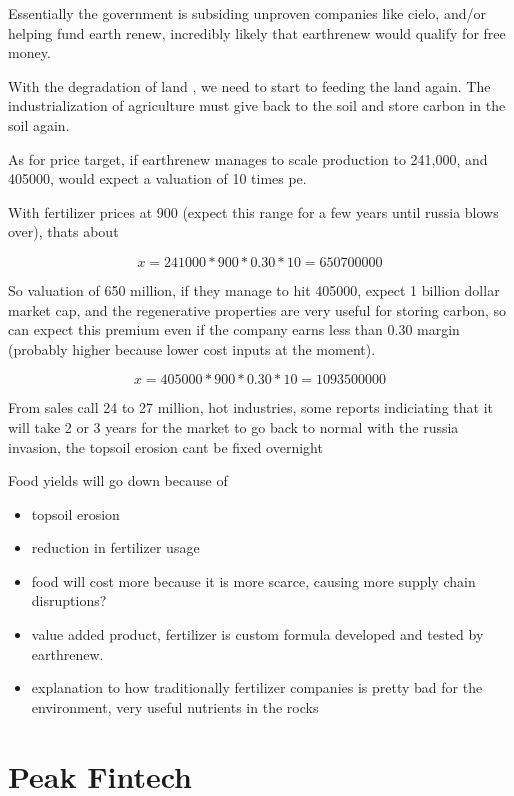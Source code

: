 Essentially the government is subsiding unproven companies like cielo, and/or helping fund earth renew, incredibly likely that earthrenew would qualify for free money.

With the degradation of land \cite{the_guardian_degraded_2022}, we need to start to feeding the land again. The industrialization of agriculture must give back to the soil and store carbon in the soil again.

As for price target, if earthrenew manages to scale production to 241,000, and 405000, would expect a valuation of 10 times pe.

With fertilizer prices at 900 (expect this range for a few years until russia blows over), thats about 

\begin{equation}
  x = 241000*900*0.30*10 = 650700000
\end{equation}

So valuation of 650 million, if they manage to hit 405000, expect 1 billion dollar market cap, and the regenerative properties are very useful for storing carbon, so can expect this premium even if the company earns less than 0.30 margin (probably higher because lower cost inputs at the moment).

\begin{equation}
  x = 405000*900*0.30*10 = 1093500000
\end{equation}


From sales call 24 to 27 million, hot industries, some reports indiciating that it will take 2 or 3 years for the market to go back to normal with the russia invasion, the topsoil erosion cant be fixed overnight

Food yields will go down because of

\begin{itemize}
    \item topsoil erosion
    \item reduction in fertilizer usage
    \item food will cost more because it is more scarce, causing more supply chain disruptions?
    \item value added product, fertilizer is custom formula developed and tested by earthrenew.
    \item explanation to how traditionally fertilizer companies is pretty bad for the environment, very useful nutrients in the rocks
\end{itemize}

\section{Peak Fintech}

